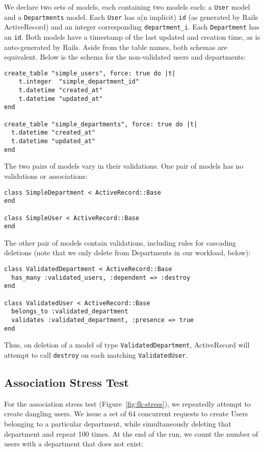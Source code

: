We declare two sets of models, each containing two models each: a \texttt{User} model and a \texttt{Departments} model. Each \texttt{User} has a(n implicit) \texttt{id} (as generated by Rails ActiveRecord) and an integer corresponding \texttt{department\_i}. Each \texttt{Department} has an \texttt{id}. Both models have a timestamp of the last updated and creation time, as is auto-generated by Rails. Aside from the table names, both schemas are equivalent. Below is the schema for the non-validated users and departments:
\begin{lstlisting}
create_table "simple_users", force: true do |t|
    t.integer  "simple_department_id"
    t.datetime "created_at"
    t.datetime "updated_at"
end

create_table "simple_departments", force: true do |t|
  t.datetime "created_at"
  t.datetime "updated_at"
end
\end{lstlisting}
The two pairs of models vary in their validations. One pair of models has no validations or associations:
\begin{lstlisting}
class SimpleDepartment < ActiveRecord::Base
end

class SimpleUser < ActiveRecord::Base
end
\end{lstlisting}
The other pair of models contain validations, including rules for cascading deletions (note that we only delete from Departments in our workload, below):
\begin{lstlisting}
class ValidatedDepartment < ActiveRecord::Base
  has_many :validated_users, :dependent => :destroy
end

class ValidatedUser < ActiveRecord::Base
  belongs_to :validated_department
  validates :validated_department, :presence => true
end
\end{lstlisting}
Thus, on deletion of a model of type \texttt{ValidatedDepartment}, ActiveRecord will attempt to call \texttt{destroy} on each matching \texttt{ValidatedUser}.

\subsection{Association Stress Test}
\label{sec:appendix-association-stress}

For the association stress test (Figure~\ref{fig:fk-stress}), we repeatedly attempt to create dangling users. We issue a set of 64 concurrent requests to create Users belonging to a particular department, while simultaneously deleting that department and repeat 100 times. At the end of the run, we count the number of users with a department that does not exist:

